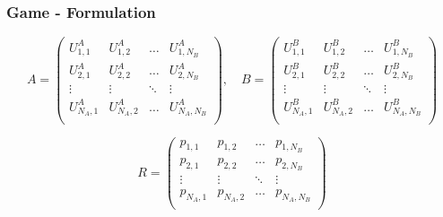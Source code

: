 \begin{frame}
    \frametitle{Game - Formulation}
    \centering

    \scriptsize
    \begin{equation*}
        A = 
        \begin{pmatrix}
            U_{1,1}^A & U_{1,2}^A & \dots & U_{1,N_B}^A \\ 
            U_{2,1}^A & U_{2,2}^A & \dots & U_{2,N_B}^A \\
            \vdots & \vdots & \ddots & \vdots \\
            U_{N_A,1}^A & U_{N_A,2}^A & \dots & U_{N_A,N_B}^A \\
        \end{pmatrix}, \quad
        B = 
        \begin{pmatrix}
            U_{1,1}^B & U_{1,2}^B & \dots & U_{1,N_B}^B \\ 
            U_{2,1}^B & U_{2,2}^B & \dots & U_{2,N_B}^B \\
            \vdots & \vdots & \ddots & \vdots \\
            U_{N_A,1}^B & U_{N_A,2}^B & \dots & U_{N_A,N_B}^B \\
        \end{pmatrix}
    \end{equation*}

    \begin{equation*}
        R = 
        \begin{pmatrix}
            p_{1,1} & p_{1,2} & \dots & p_{1,N_B} \\ 
            p_{2,1} & p_{2,2} & \dots & p_{2,N_B} \\
            \vdots & \vdots & \ddots & \vdots \\
            p_{N_A,1} & p_{N_A,2} & \dots & p_{N_A,N_B} \\
        \end{pmatrix}
    \end{equation*}

\end{frame}